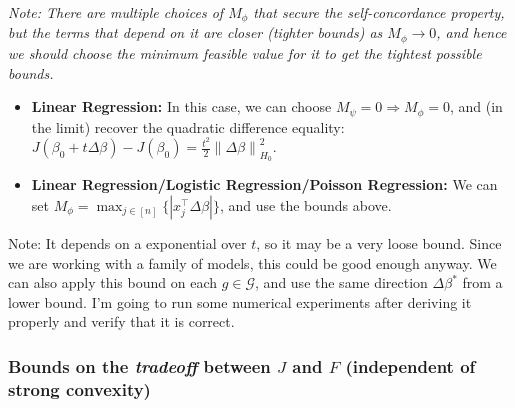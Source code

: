 \documentclass[11pt]{article}
\theoremstyle{plain}
\theoremstyle{definition}
\newcommand{\norm}[1]{\left\lVert #1 \right\rVert}
\newcommand{\1}{\mathbf{1}}
\newcommand{\G}{\mathcal{G}}
\renewcommand{\t}{^{\top}}
\begin{document}
\textit{Note: There are multiple choices of $M_{\phi}$ that secure the self-concordance property, but the terms that depend on it are closer (tighter bounds) as $M_\phi \rightarrow 0$, and hence we should choose the minimum feasible value for it to get the tightest possible bounds.} 
\begin{tcolorbox}[
    colback=lightgray, %
    width=\linewidth, %
    sharp corners=all %
]
\begin{itemize}
    \item \textbf{Linear Regression:} In this case, we can choose $M_\psi=0\Rightarrow M_\phi=0$, and (in the limit) recover the quadratic difference equality: $J(\beta_0+t \Delta \beta)- J(\beta_0) = \frac{t^2}{2}\norm{\Delta\beta}_{H_0}^2$. 

    \item \textbf{Linear Regression/Logistic Regression/Poisson Regression:} We can set $M_\phi=  \max_{j\in[n]}\{|x_j\t \Delta \beta|\}$, and use the bounds above.
\end{itemize}
\end{tcolorbox}





{\color{red} Note: It depends on a exponential over $t$, so it may be a very loose bound. Since we are working with a family of models, this could be good enough anyway. We can also apply this bound on each $g\in \G$, and use the same direction $\Delta \beta^*$ from a lower bound. I'm going to run some numerical experiments after deriving it properly and verify that it is correct.}


\subsubsection{Bounds on the \textit{tradeoff} between $J$ and $F$ (independent of strong convexity)}
\end{document}
